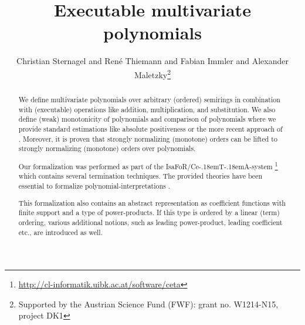\documentclass[11pt,a4paper]{article}
\newcommand\isafor{\textsf{IsaFoR}}
\newcommand\ceta{\textsf{Ce\kern-.18emT\kern-.18emA}}
\begin{document}
\title{Executable multivariate polynomials}
\author{Christian Sternagel and Ren\'e Thiemann and Fabian Immler and Alexander
Maletzky\thanks{Supported by the Austrian Science Fund (FWF): grant no. W1214-N15, project DK1}}
\maketitle

\begin{abstract}
  We define multivariate polynomials over arbitrary (ordered)
  semirings in combination with (executable) operations like addition, multiplication,
  and substitution. We also define (weak) monotonicity of polynomials
  and comparison of polynomials where we provide standard estimations 
  like absolute positiveness or the more recent
  approach of \cite{NZM10}. Moreover, it is proven
  that strongly normalizing (monotone) orders
  can be lifted to strongly normalizing (monotone) orders over polynomials.

  Our formalization was performed as part of the \isafor/\ceta-system 
  \cite{CeTA}\footnote{\url{http://cl-informatik.uibk.ac.at/software/ceta}}
  which
  contains several termination techniques. The provided theories have been
  essential to formalize polynomial-interpretations \cite{L79,Rational}.

  This formalization also contains an abstract representation as coefficient functions with finite
  support and a type of power-products. If this type is ordered by a linear (term) ordering, various
  additional notions, such as leading power-product, leading coefficient etc., are introduced as
  well.
\end{abstract}

\tableofcontents








\end{document}
